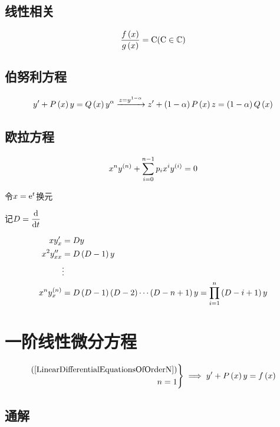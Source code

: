 \documentclass{article}
\begin{document}
\subsection{线性相关}

\[\frac{f\left(x\right)}{g\left(x\right)}=\mathrm C(\mathrm C\in\mathbb C)\]

\subsection{伯努利方程}

\[y^\prime+P\left(x\right)y=Q\left(x\right)y^\alpha\xrightarrow{z=y^{1-\alpha}} z^\prime+\left(1-\alpha\right)P\left(x\right)z=\left(1-\alpha\right)Q\left(x\right)\]

\subsection{欧拉方程}

\[x^ny^{\left(n\right)}+\sum_{i=0}^{n-1}p_ix^iy^{\left(i\right)}=0\]

令$x=\mathrm e^t$换元

记$D=\dfrac{\mathrm d}{\mathrm d t}$

\[\begin{aligned}
        xy_x^\prime              & =Dy                                                      \\
        x^2y_{xx}^{\prime\prime} & =D\left(D-1\right)y                                               \\
                                 & \vdots                                                   \\
        x^ny_x^{\left(n\right)}           & =D\left(D-1\right)\left(D-2\right)\cdots\left(D-n+1\right)y=\prod_{i=1}^n\left(D-i+1\right)y
    \end{aligned}\]

\section{一阶线性微分方程}

\begin{definition}
    \[\left.\begin{aligned}
            \left(\ref{LinearDifferentialEquationsOfOrderN}\right) \\
            n=1
        \end{aligned}\right\}
        \implies
        y^\prime+P\left(x\right)y=f\left(x\right)\]
\end{definition}

\subsection{通解}
\end{document}
